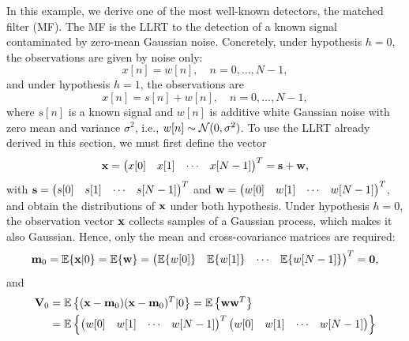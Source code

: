 \begin{example}
	In this example, we derive one of the most well-known detectors, the matched filter (MF). The MF is the LLRT to the detection of a known signal contaminated by zero-mean Gaussian noise. Concretely, under hypothesis $h=0$, the observations are given by noise only:
	\begin{equation*}
	x[n] = w[n], \quad n = 0, \ldots, N-1,
	\end{equation*}
	and under  hypothesis $h=1$, the observations are
	\begin{equation*}
	x[n] = s[n] + w[n], \quad n = 0, \ldots, N-1,
	\end{equation*}
	where $s[n]$ is a known signal and $w[n]$ is additive white Gaussian noise with zero mean and variance $\sigma^2$, i.e., $w[n] \sim {\mathcal N}(0,\sigma^2)$. To use the LLRT already derived in this section, we must first define the vector
	\begin{equation*}
	{\bf x} = \begin{pmatrix} x[0] & x[1] & \cdots & x[N-1] \end{pmatrix}^T = {\bf s} + {\bf w},
	\end{equation*}
	with ${\bf s} = \begin{pmatrix} s[0] & s[1] & \cdots & s[N-1] \end{pmatrix}^T $ and ${\bf w} = \begin{pmatrix} w[0] & w[1] & \cdots & w[N-1] \end{pmatrix}^T$, and obtain the distributions of ${\bf x}$ under both hypothesis. Under hypothesis $h=0$, the observation vector ${\bf x}$ collects samples of a Gaussian process, which makes it also Gaussian. Hence, only the mean and cross-covariance matrices are required:
	\begin{equation*}
	{\bf m}_0 = \mathbb{E}\{{\bf x}|0\} = \mathbb{E}\{{\bf w}\} = \begin{pmatrix} \mathbb{E}\{w[0]\}  & \mathbb{E}\{w[1]\} & \cdots & \mathbb{E}\{w[N-1]\} \end{pmatrix}^T = \mathbf{0},
	\end{equation*}
    and
	\begin{align*}
		{\bf V}_0 &= \mathbb{E}\left\{({\bf x} - {\bf m}_0) ({\bf x} - {\bf m}_0)^T|0\right\} = \mathbb{E}\left\{{\bf w} {\bf w}^T\right\} \\ &= \mathbb{E}\left\{\begin{pmatrix} w[0] & w[1] & \cdots & w[N-1] \end{pmatrix}^T \begin{pmatrix} w[0] & w[1] & \cdots & w[N-1] \end{pmatrix}\right\} \\

\end{align*}
\end{example}
